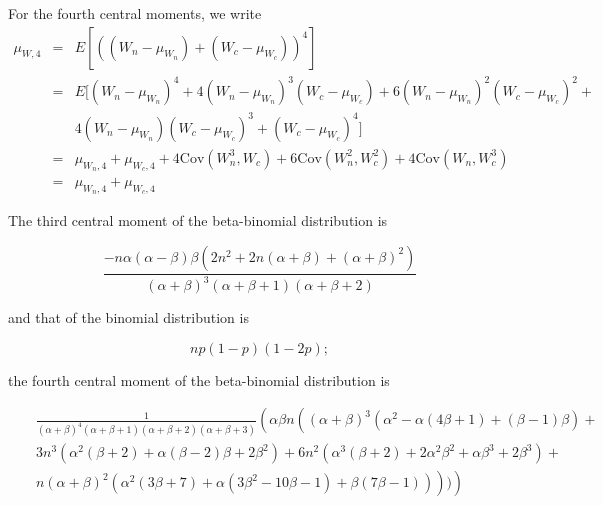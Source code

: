 \documentclass{article}
\begin{document}
For the fourth central moments, we write
    \begin{eqnarray}
        \mu_{W,4}&=&E[((W_n-\mu_{W_n})+(W_c-\mu_{W_c}))^4]\\
        &=&E[(W_n-\mu_{W_n})^4+4(W_n-\mu_{W_n})^3(W_c-\mu_{W_c})+          6(W_n-\mu_{W_n})^2(W_c-\mu_{W_c})^2 +\nonumber \\
          && 4(W_n-\mu_{W_n})(W_c-\mu_{W_c})^3+(W_c-\mu_{W_c})^4]\\
          &=&\mu_{W_n,4}+\mu_{W_c,4}+4\mathrm{Cov}(W_n^3,W_c)+
            6\mathrm{Cov}(W_n^2,W_c^2)+4\mathrm{Cov}(W_n,W_c^3)\\
          &=&\mu_{W_n,4}+\mu_{W_c,4} \label{eq:fourthcentralW}
    \end{eqnarray}

The third central moment of the beta-binomial distribution is

\begin{equation}
  \frac{-n \alpha(\alpha-\beta) \beta (2n^2 + 2n(\alpha + \beta) + (\alpha+\beta)^2)}{(\alpha+\beta)^3 (\alpha + \beta + 1)(\alpha + \beta+2)} \label{moment3bb}
\end{equation}

and that of the binomial distribution is

\begin{equation}
  np(1-p)(1-2p); \label{moment3b}
\end{equation}

the fourth central moment of the beta-binomial distribution is

\begin{eqnarray}
  && \frac{1}{(\alpha +\beta )^4 (\alpha +\beta +1) (\alpha +\beta +2) (\alpha +\beta +3)} \left( \alpha  \beta  n \left((\alpha +\beta )^3 \left(\alpha ^2-\alpha  (4 \beta +1)+(\beta -1) \beta \right)+ \right. \right. \nonumber \\
  && 3 n^3 \left(\alpha ^2 (\beta +2)+\alpha  (\beta -2) \beta +2 \beta ^2\right)+6 n^2 \left(\alpha ^3 (\beta +2)+2 \alpha ^2 \beta ^2+\alpha  \beta ^3+2 \beta ^3\right)+ \nonumber \\
  && \left. \left. n (\alpha +\beta )^2 \left(\alpha ^2 (3 \beta +7)+\alpha  \left(3 \beta ^2-10 \beta -1\right)+\beta  (7 \beta -1)\right)\right)) \right) \label{moment4bb}
\end{eqnarray}
\end{document}
